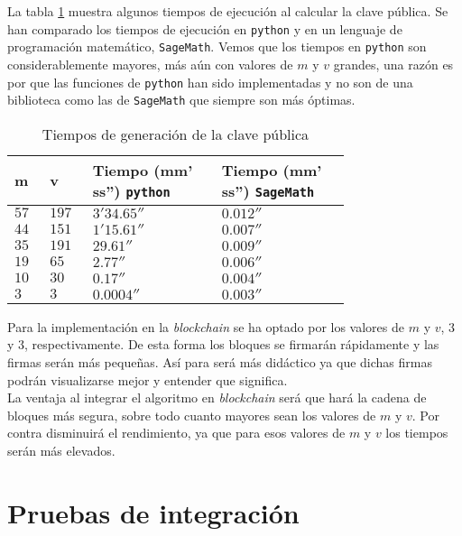 La tabla \ref{tab:tiempos} muestra algunos tiempos de ejecución al calcular la clave pública. Se han comparado los tiempos de ejecución en \texttt{python} y en un lenguaje de programación matemático, \texttt{SageMath}. Vemos que los tiempos en \texttt{python} son considerablemente mayores, más aún con valores de $m$ y $v$ grandes, una razón es por que las funciones de \texttt{python} han sido implementadas y no son de una biblioteca como las de \texttt{SageMath} que siempre son más óptimas.\\ 

\begin{table}[H]
	\begin{center}
		\begin{tabular}{p{0.07\linewidth}p{0.07\linewidth}p{0.3\linewidth}p{0.3\linewidth}}
			\textbf{m} & \textbf{v} & \textbf{Tiempo (mm' ss'')} \texttt{python} & \textbf{Tiempo (mm' ss'')} \texttt{SageMath}\\
			\toprule
				$57$ & $197$ & $3'34.65''$ & $0.012''$\\
				$44$ & $151$ & $1'15.61''$ & $0.007''$\\
				$35$ & $191$ & $29.61''$ & $0.009''$\\ 
				$19$ & $65$ & $2.77''$ & $0.006''$\\
				$10$ & $30$ & $0.17''$ & $0.004''$\\
				$3$ & $3$ & $0.0004''$ & $0.003''$\\
			\bottomrule
		\end{tabular}
	\end{center}
	\caption{Tiempos de generación de la clave pública}
	\label{tab:tiempos}
\end{table}

Para la implementación en la \textit{blockchain} se ha optado por los valores de $m$ y $v$, $3$ y $3$, respectivamente. De esta forma los bloques se firmarán rápidamente y las firmas serán más pequeñas. Así para será más didáctico ya que dichas firmas podrán visualizarse mejor y entender que significa.\\

La ventaja al integrar el algoritmo en \textit{blockchain} será que hará la cadena de bloques más segura, sobre todo cuanto mayores sean los valores de $m$ y $v$. Por contra disminuirá el rendimiento, ya que para esos valores de $m$ y $v$ los tiempos serán más elevados.\\

\section{Pruebas de integración}

